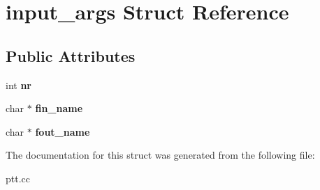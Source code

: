 \hypertarget{structinput__args}{
\section{input\_\-args Struct Reference}
\label{structinput__args}
}
\subsection*{Public Attributes}
\begin{DoxyCompactItemize}
\item 
\hypertarget{structinput__args_acce29ac1b53176d1378cd032cd91a81e}{
int {\bfseries nr}}
\label{structinput__args_acce29ac1b53176d1378cd032cd91a81e}

\item 
\hypertarget{structinput__args_a7008972ceaca6361b86786d904af32d8}{
char $\ast$ {\bfseries fin\_\-name}}
\label{structinput__args_a7008972ceaca6361b86786d904af32d8}

\item 
\hypertarget{structinput__args_a7db8d3978c4f03d0790ff252e59daffe}{
char $\ast$ {\bfseries fout\_\-name}}
\label{structinput__args_a7db8d3978c4f03d0790ff252e59daffe}

\end{DoxyCompactItemize}


The documentation for this struct was generated from the following file:\begin{DoxyCompactItemize}
\item 
ptt.cc\end{DoxyCompactItemize}
